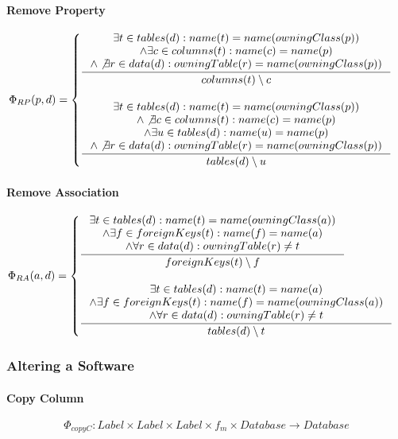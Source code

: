 \documentclass[11pt]{article}
\begin{document}
\paragraph{Remove Property}
$$
\Phi_{RP}(p, d) = \begin{cases}
 \inference{ \exists t \in tables(d) : name(t) = name(owningClass(p)) \\ \wedge \exists c \in columns(t) : name(c) = name(p) \\ \wedge \not \exists r \in data(d) : owningTable(r) = name(owningClass(p)) }{columns(t) \setminus c
} \\ \\
  \inference{ \exists t \in tables(d) : name(t) = name(owningClass(p)) \\ \wedge \not \exists c \in columns(t) : name(c) = name(p) \\ \wedge \exists u \in tables(d) : name(u) = name(p) \\ \wedge \not \exists r \in data(d) : owningTable(r) = name(owningClass(p))}{ tables(d) \setminus u }
 \end{cases}
$$

\paragraph{Remove Association}
$$
\Phi_{RA}(a, d) =  \begin{cases}
 \inference{\exists t \in tables(d) : name(t) = name(owningClass(a))
 \\ \wedge \exists f \in foreignKeys(t) : name(f) = name(a)
 \\ \wedge \forall r \in data(d) : owningTable(r) \neq t}{ foreignKeys(t) \setminus f }
 \\ \\
 \inference{\exists t \in tables(d) : name(t) = name(a)
 \\ \wedge \exists f \in foreignKeys(t) : name(f) = name(owningClass(a))
 \\ \wedge \forall r \in data(d) : owningTable(r) \neq t}{ tables(d) \setminus t}
 \end{cases}
$$

\subsubsection{Altering a Software}	
\paragraph{Copy Column}
$$\Phi_{copyC} : Label \times Label \times Label \times f_m \times Database \rightarrow Database $$
\end{document}
